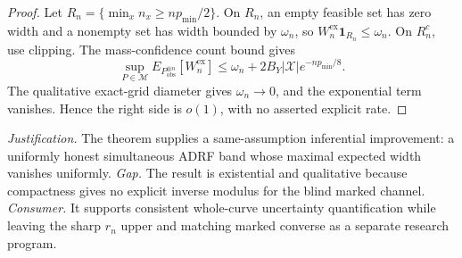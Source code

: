 \documentclass{article}
\begin{document}
\begin{proof}
Let \(R_n=\{\min_xn_x\ge np_{\min}/2\}\). On \(R_n\), an empty feasible set has zero width and a nonempty set has width bounded by \(\omega_n\), so \(W_n^{\mathrm{ex}}\mathbf1_{R_n}\le\omega_n\). On \(R_n^c\), use clipping. The mass-confidence count bound gives
\[
 \sup_{P\in\mathcal M}E_{P_{\mathrm{obs}}^{\otimes n}}[W_n^{\mathrm{ex}}]
 \le\omega_n+2B_Y|\mathcal X|e^{-np_{\min}/8}.
\]
The qualitative exact-grid diameter gives \(\omega_n\to0\), and the exponential term vanishes. Hence the right side is \(o(1)\), with no asserted explicit rate.
\end{proof}
\par\smallskip\noindent \textit{Justification.} The theorem supplies a same-assumption inferential improvement: a uniformly honest simultaneous ADRF band whose maximal expected width vanishes uniformly. \textit{Gap.} The result is existential and qualitative because compactness gives no explicit inverse modulus for the blind marked channel. \textit{Consumer.} It supports consistent whole-curve uncertainty quantification while leaving the sharp \(r_n\) upper and matching marked converse as a separate research program.
\end{document}
